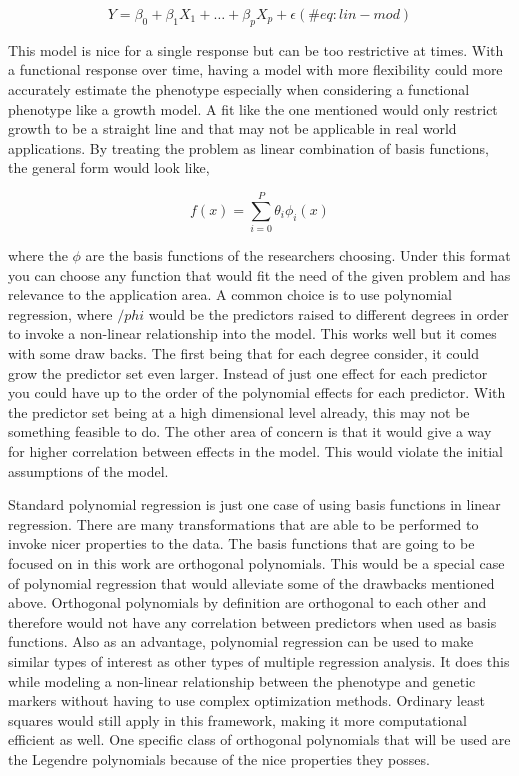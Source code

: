 \documentclass[11pt,]{book}
\theoremstyle{definition}
\theoremstyle{definition}
\theoremstyle{remark}
\begin{document}
\begin{equation}
Y = \beta_0 + \beta_1 X_1 + \dots + \beta_p X_p + \epsilon
(\#eq: lin-mod)
\end{equation}

This model is nice for a single response but can be too restrictive at
times. With a functional response over time, having a model with more
flexibility could more accurately estimate the phenotype especially when
considering a functional phenotype like a growth model. A fit like the
one mentioned would only restrict growth to be a straight line and that
may not be applicable in real world applications. By treating the
problem as linear combination of basis functions, the general form would
look like,

\begin{equation}
f(x) = \sum_{i=0}^P \theta_i \phi_i(x)
\label{eq:gen-form}
\end{equation}

where the \(\phi\) are the basis functions of the researchers choosing.
Under this format you can choose any function that would fit the need of
the given problem and has relevance to the application area. A common
choice is to use polynomial regression, where \(/phi\) would be the
predictors raised to different degrees in order to invoke a non-linear
relationship into the model. This works well but it comes with some draw
backs. The first being that for each degree consider, it could grow the
predictor set even larger. Instead of just one effect for each predictor
you could have up to the order of the polynomial effects for each
predictor. With the predictor set being at a high dimensional level
already, this may not be something feasible to do. The other area of
concern is that it would give a way for higher correlation between
effects in the model. This would violate the initial assumptions of the
model.

Standard polynomial regression is just one case of using basis functions
in linear regression. There are many transformations that are able to be
performed to invoke nicer properties to the data. The basis functions
that are going to be focused on in this work are orthogonal polynomials.
This would be a special case of polynomial regression that would
alleviate some of the drawbacks mentioned above. Orthogonal polynomials
by definition are orthogonal to each other and therefore would not have
any correlation between predictors when used as basis functions. Also as
an advantage, polynomial regression can be used to make similar types of
interest as other types of multiple regression analysis. It does this
while modeling a non-linear relationship between the phenotype and
genetic markers without having to use complex optimization methods.
Ordinary least squares would still apply in this framework, making it
more computational efficient as well. One specific class of orthogonal
polynomials that will be used are the Legendre polynomials because of
the nice properties they posses.
\end{document}
